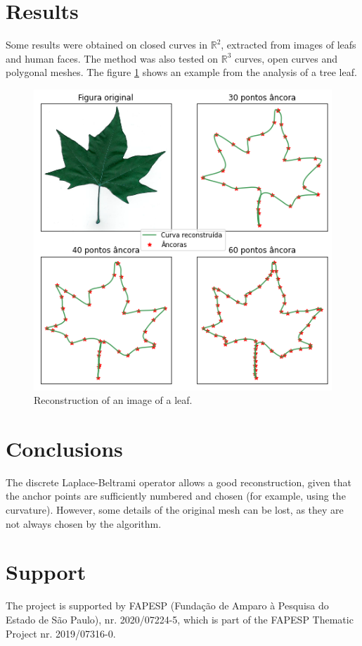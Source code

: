 \documentclass[a4paper,10pt,twocolumn]{article}
\begin{document}
	
	\section*{\hfil Results}
	
	Some results were obtained on closed curves in $\mathbb{R}^2$, extracted from images of leafs and human faces. The method was also tested on $\mathbb{R}^3$ curves, open curves and polygonal meshes. The figure \ref{fig:leafs} shows an example from the analysis of a tree leaf.

	\begin{figure}[ht!]
		\centering
		\includegraphics[width=0.9\linewidth]{imagens/leafs.png}
		\caption{Reconstruction of an image of a leaf.}
		\label{fig:leafs}
	\end{figure}
	
	
	\section*{\hfil Conclusions}
	The discrete Laplace-Beltrami operator allows a good reconstruction, given that the anchor points are sufficiently numbered and chosen (for example, using the curvature). However, some details of the original mesh can be lost, as they are not always chosen by the algorithm.
	
	
	\renewcommand\refname{\hfil References \hfil}
	\begin{center}
	\begin{thebibliography}{LLL}	
	\end{thebibliography}
	\end{center}
	
	\section*{\hfil Support}
	The project is supported by FAPESP (Fundação de Amparo à Pesquisa do Estado de São Paulo), nr. 2020/07224-5, which is part of the FAPESP Thematic Project nr. 2019/07316-0.
	
	
\end{document}
